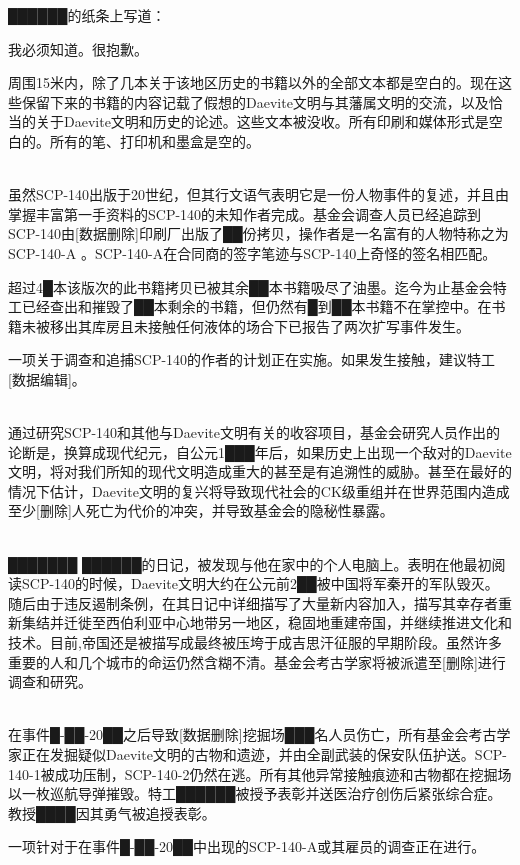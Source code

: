 ██████的纸条上写道：

\begin{scpbox}

我必须知道。很抱歉。

\end{scpbox}

周围15米内，除了几本关于该地区历史的书籍以外的全部文本都是空白的。现在这些保留下来的书籍的内容记载了假想的Daevite文明与其藩属文明的交流，以及恰当的关于Daevite文明和历史的论述。这些文本被没收。所有印刷和媒体形式是空白的。所有的笔、打印机和墨盒是空的。

\\
虽然SCP-140出版于20世纪，但其行文语气表明它是一份人物事件的复述，并且由掌握丰富第一手资料的SCP-140的未知作者完成。基金会调查人员已经追踪到SCP-140由{[}数据删除]印刷厂出版了██份拷贝，操作者是一名富有的人物特称之为SCP-140-A 。SCP-140-A在合同商的签字笔迹与SCP-140上奇怪的签名相匹配。

超过4█本该版次的此书籍拷贝已被其余██本书籍吸尽了油墨。迄今为止基金会特工已经查出和摧毁了██本剩余的书籍，但仍然有█到██本书籍不在掌控中。在书籍未被移出其库房且未接触任何液体的场合下已报告了两次扩写事件发生。

一项关于调查和追捕SCP-140的作者的计划正在实施。如果发生接触，建议特工{[}数据编辑]。

\\
通过研究SCP-140和其他与Daevite文明有关的收容项目，基金会研究人员作出的论断是，换算成现代纪元，自公元1███年后，如果历史上出现一个敌对的Daevite文明，将对我们所知的现代文明造成重大的甚至是有追溯性的威胁。甚至在最好的情况下估计，Daevite文明的复兴将导致现代社会的CK级重组并在世界范围内造成至少{[}删除]人死亡为代价的冲突，并导致基金会的隐秘性暴露。

\\
███████ ██████的日记，被发现与他在家中的个人电脑上。表明在他最初阅读SCP-140的时候，Daevite文明大约在公元前2██被中国将军秦开的军队毁灭。随后由于违反遏制条例，在其日记中详细描写了大量新内容加入，描写其幸存者重新集结并迁徙至西伯利亚中心地带另一地区，稳固地重建帝国，并继续推进文化和技术。目前,帝国还是被描写成最终被压垮于成吉思汗征服的早期阶段。虽然许多重要的人和几个城市的命运仍然含糊不清。基金会考古学家将被派遣至{[}删除]进行调查和研究。

\\
在事件█-██-20██之后导致{[}数据删除]挖掘场███名人员伤亡，所有基金会考古学家正在发掘疑似Daevite文明的古物和遗迹，并由全副武装的保安队伍护送。SCP-140-1被成功压制，SCP-140-2仍然在逃。所有其他异常接触痕迹和古物都在挖掘场以一枚巡航导弹摧毁。特工██████被授予表彰并送医治疗创伤后紧张综合症。教授████因其勇气被追授表彰。

一项针对于在事件█-██-20██中出现的SCP-140-A或其雇员的调查正在进行。
